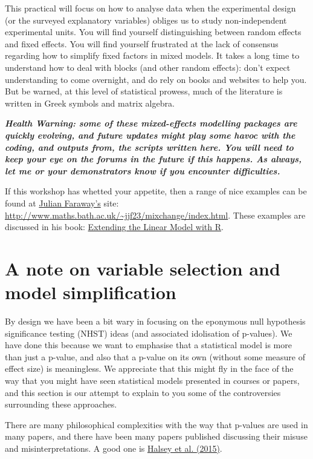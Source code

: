 \documentclass[]{book}
\theoremstyle{definition}
\theoremstyle{definition}
\theoremstyle{definition}
\theoremstyle{remark}
\begin{document}
This practical will focus on how to analyse data when the experimental
design (or the surveyed explanatory variables) obliges us to study
non-independent experimental units. You will find yourself
distinguishing between random effects and fixed effects. You will find
yourself frustrated at the lack of consensus regarding how to simplify
fixed factors in mixed models. It takes a long time to understand how to
deal with blocks (and other random effects): don't expect understanding
to come overnight, and do rely on books and websites to help you. But be
warned, at this level of statistical prowess, much of the literature is
written in Greek symbols and matrix algebra.

\textbf{\emph{Health Warning: some of these mixed-effects modelling
packages are quickly evolving, and future updates might play some havoc
with the coding, and outputs from, the scripts written here. You will
need to keep your eye on the forums in the future if this happens. As
always, let me or your demonstrators know if you encounter
difficulties.}}

If this workshop has whetted your appetite, then a range of nice
examples can be found at
\href{http://www.maths.bath.ac.uk/~jjf23/}{Julian Faraway's} site:
\url{http://www.maths.bath.ac.uk/~jjf23/mixchange/index.html}. These
examples are discussed in his book:
\href{https://www.amazon.co.uk/Extending-Linear-Model-Generalized-Nonparametric/dp/158488424X}{Extending
the Linear Model with R}.

\section{A note on variable selection and model
simplification}\label{a-note-on-variable-selection-and-model-simplification}

By design we have been a bit wary in focusing on the eponymous null
hypothesis significance testing (NHST) ideas (and associated idolisation
of p-values). We have done this because we want to emphasise that a
statistical model is more than just a p-value, and also that a p-value
on its own (without some measure of effect size) is meaningless. We
appreciate that this might fly in the face of the way that you might
have seen statistical models presented in courses or papers, and this
section is our attempt to explain to you some of the controversies
surrounding these approaches.

There are many philosophical complexities with the way that p-values are
used in many papers, and there have been many papers published
discussing their misuse and misinterpretations. A good one is
\href{https://www.nature.com/articles/nmeth.3288.pdf?origin=ppub}{Halsey
et al. (2015)}.
\end{document}
